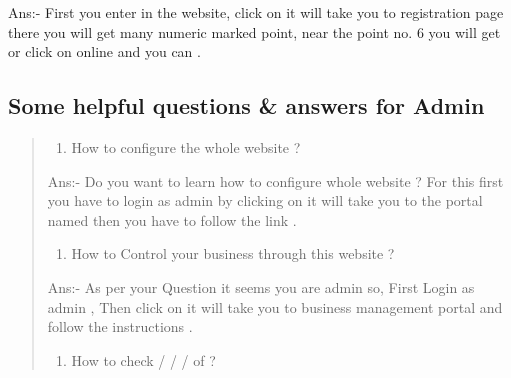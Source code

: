 \documentclass[a4paper,10pt,english]{report}
\begin{document}
Ans:- First you enter in the website, click on  it will take you to registration page there you will get many numeric marked point,
near the point no. 6 you will get  or   click on online and you can {\hyperref[\detokenize{register:chat-with-customer-care}]{}} .


\subsection{Some helpful questions \& answers for Admin}
\label{\detokenize{faq:some-helpful-questions-answers-for-admin}}\begin{quote}
\begin{enumerate}
\def\theenumi{\arabic{enumi}}
\def\labelenumi{\theenumi .}
\makeatletter\def\p@enumii{\p@enumi \theenumi .}\makeatother
\item {} 
How to configure the whole website ?

\end{enumerate}

Ans:- Do you want to learn how to configure whole website ? For this first you have to login as admin by clicking on  it will take you to the portal named  then you have to follow the link {\hyperref[\detokenize{adminlogedin:admin-loged-in}]{}} .
\begin{enumerate}
\def\theenumi{\arabic{enumi}}
\def\labelenumi{\theenumi .}
\makeatletter\def\p@enumii{\p@enumi \theenumi .}\makeatother
\setcounter{enumi}{1}
\item {} 
How to Control your business through this website ?

\end{enumerate}

Ans:- As per your Question it seems you are admin so, First Login as admin {\hyperref[\detokenize{login:login}]{}} , Then click on  it will take you to business management portal  and follow the instructions {\hyperref[\detokenize{businessmgmt:business-management}]{}} .
\begin{enumerate}
\def\theenumi{\arabic{enumi}}
\def\labelenumi{\theenumi .}
\makeatletter\def\p@enumii{\p@enumi \theenumi .}\makeatother
\setcounter{enumi}{2}
\item {} 
How to check  /  /  /   of  ?


\end{enumerate}
\end{quote}
\end{document}
